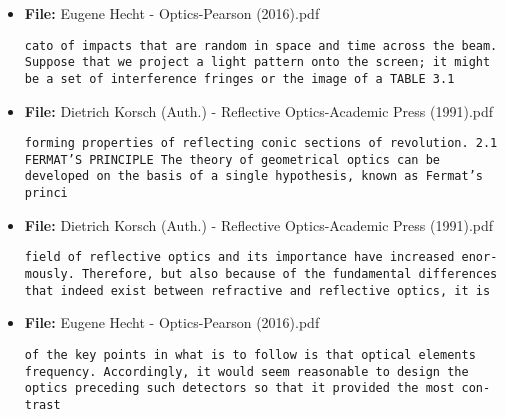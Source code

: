 \begin{itemize}
  \item \textbf{File:} Eugene Hecht - Optics-Pearson (2016).pdf

  \texttt{cato of impacts that are random in space and time across the  beam. Suppose that we project a light pattern onto the screen;  it might be a set of interference fringes or the image of a  TABLE 3.1    }

  \item \textbf{File:} Dietrich Korsch (Auth.) - Reflective Optics-Academic Press (1991).pdf

  \texttt{forming properties of reflecting conic sections of revolution.  2.1 FERMAT'S PRINCIPLE  The theory of geometrical optics can be developed on the basis of a  single hypothesis, known as Fermat's princi}

  \item \textbf{File:} Dietrich Korsch (Auth.) - Reflective Optics-Academic Press (1991).pdf

  \texttt{field of reflective optics and its importance have increased enor­ mously. Therefore, but also because of the fundamental differences  that indeed exist between refractive and reflective optics, it is}

  \item \textbf{File:} Eugene Hecht - Optics-Pearson (2016).pdf

  \texttt{of the key points in what is to follow is that optical elements  frequency. Accordingly, it would seem reasonable to design the  optics preceding such detectors so that it provided the most con- trast}

\end{itemize}
